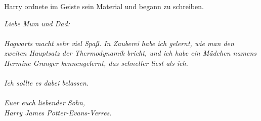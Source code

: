 Harry ordnete im Geiste sein Material und begann zu schreiben.

\emph{Liebe Mum und Dad:\\~\\
Hogwarts macht sehr viel Spaß. In Zauberei habe ich gelernt, wie man den zweiten
Hauptsatz der Thermodynamik bricht, und ich habe ein Mädchen namens Hermine
Granger kennengelernt, das schneller liest als ich.\\~\\
Ich sollte es dabei belassen.\\~\\
Euer euch liebender Sohn,\\
Harry James Potter-Evans-Verres.}
